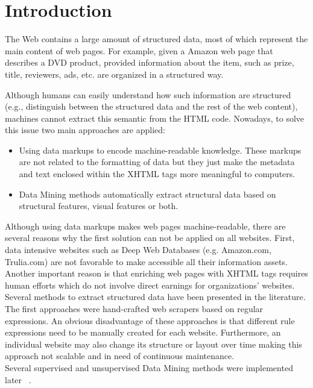 

\section{Introduction}
The Web contains a large amount of structured data, most of which represent the main content of web pages. For example, given a Amazon web page that describes a DVD product, provided information about the item, such as prize, title, reviewers, ads, etc. are organized in a structured way. 

Although humans can easily understand how such information are structured (e.g., distinguish between the structured data and the rest of the web content),  machines cannot extract this semantic from
the HTML code.
Nowadays, to solve this issue two main approaches are applied: 
\begin{itemize}
\item Using data markups to encode machine-readable knowledge. These markups are not related to the formatting of data but they just make the metadata and text enclosed within the XHTML tags more meaningful to computers.   
\item Data Mining methods automatically extract structural data based on structural features, visual features or both. 
\end{itemize}
Although using data markups makes web pages machine-readable, there are several reasons why the first solution can not be applied on all websites. First, data intensive websites such as Deep Web Databases (e.g. Amazon.com, Trulia.com) are not favorable to make accessible all their information assets. Another important reason is that enriching web pages with XHTML tags requires human efforts which do not involve direct earnings for organizations' websites.\\
Several methods to extract structured data have been presented in the literature. The first approaches were hand-crafted web scrapers based on regular expressions. An obvious disadvantage of these approaches is that different rule expressions need to be manually created for each website. Furthermore, an individual website may also change its structure or layout over time
making this approach not scalable and in need of continuous maintenance. 
\\
Several supervised and unsupervised Data Mining methods were implemented later ~\cite{Liu2004,miao2009,Lerman2004,Gatterbauer2007,Liu2010}.
